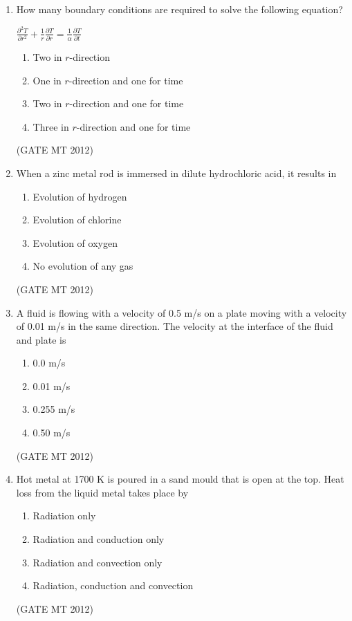 \documentclass[journal, 11pt, onecolumn]{IEEEtran}
\theoremstyle{remark}
\begin{document}
\begin{enumerate}
\begin{enumerate}
\item How many boundary conditions are required to solve the following equation?\\
\begin{center}
$\displaystyle \frac{\partial^2 T}{\partial r^2} 
+ \frac{1}{r} \frac{\partial T}{\partial r} 
= \frac{1}{\alpha} \frac{\partial T}{\partial t}$    
\end{center}

\begin{multicols}{2}
\begin{enumerate}  
\item Two in $r$-direction
\item One in $r$-direction and one for time
\item Two in $r$-direction and one for time
\item Three in $r$-direction and one for time
\end{enumerate}
\end{multicols}
\hfill(GATE MT 2012)
 

\item When a zinc metal rod is immersed in dilute hydrochloric acid, it results in 
\begin{multicols}{2}
\begin{enumerate}  
\item Evolution of hydrogen
\item Evolution of chlorine
\item Evolution of oxygen
\item No evolution of any gas
\end{enumerate}
\end{multicols}
\hfill(GATE MT 2012)

 

\item A fluid is flowing with a velocity of 0.5 m/s on a plate moving with a velocity of 0.01 m/s in the same direction. The velocity at the interface of the fluid and plate is  
\begin{multicols}{4}
\begin{enumerate}  
\item 0.0 m/s
\item 0.01 m/s
\item 0.255 m/s
\item 0.50 m/s
\end{enumerate}
\end{multicols}
\hfill(GATE MT 2012)
 

\item Hot metal at 1700 K is poured in a sand mould that is open at the top. Heat loss from the liquid metal takes place by 
\begin{multicols}{2}
\begin{enumerate}  
\item Radiation only
\item Radiation and conduction only
\item Radiation and convection only
\item Radiation, conduction and convection
\end{enumerate}
\end{multicols}
\hfill(GATE MT 2012)
 


\end{enumerate}
\end{enumerate}
\end{document}
